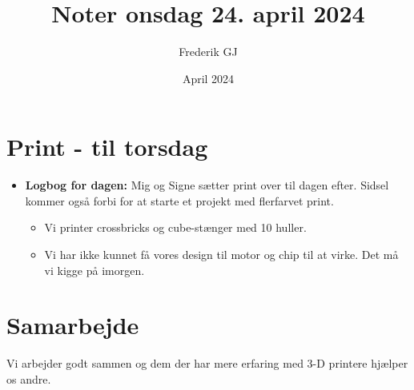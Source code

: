 \documentclass{article}
\title{Noter onsdag 24. april 2024}
\author{Frederik GJ}
\date{April 2024}
\begin{document}
\maketitle

\section{Print - til torsdag}

\begin{itemize}
    \item \textbf{Logbog for dagen:} Mig og Signe sætter print over til dagen efter. Sidsel kommer også forbi for at starte et projekt med flerfarvet print.
    \begin{itemize}
        \item Vi printer crossbricks og cube-stænger med 10 huller. 
        \item Vi har ikke kunnet få vores design til motor og chip til at virke. Det må vi kigge på imorgen. 
    \end{itemize}
\end{itemize}

\section{Samarbejde}
Vi arbejder godt sammen og dem der har mere erfaring med 3-D printere hjælper os andre. 
\end{document}
